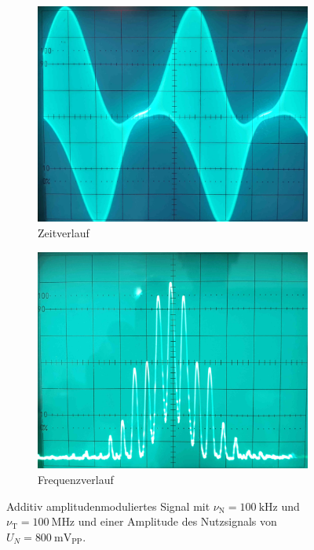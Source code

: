 \documentclass[a4paper,twoside,final]{article}
\begin{document}
\begin{figure}[htp]
    \centering
    \begin{subfigure}{0.45\textwidth}
        \includegraphics[width=\textwidth]{Bilder/AM_800mV_Amplitude.jpg}
        \caption{Zeitverlauf}
    \end{subfigure}\hspace{1cm}
    \begin{subfigure}{0.45\textwidth}
        \includegraphics[width=\textwidth]{Bilder/AM_800mV_Frequenz.jpg}
        \caption{Frequenzverlauf}
    \end{subfigure}
    \caption{Additiv amplitudenmoduliertes Signal mit $\nu_\text{N} = \SI{100}{\kilo\hertz}$ und $\nu_\text{T} = \SI{100}{\mega\hertz}$ und einer Amplitude des Nutzsignals von $U_N = \SI{800}{\milli\volt_\text{PP}}$.}
    \label{fig:Modulation_800mV}
\end{figure}\\
\end{document}
